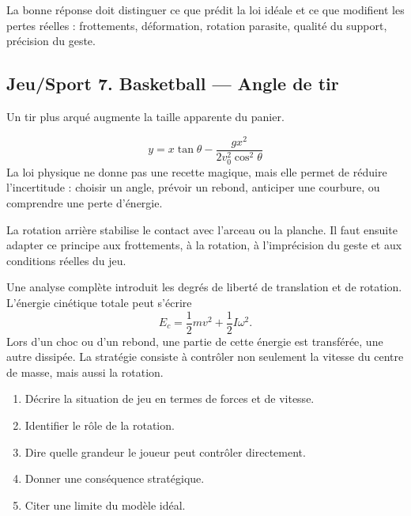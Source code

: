 \documentclass[11pt,a4paper]{article}
\begin{document}
\begin{corrigebox}[Indication]
La bonne réponse doit distinguer ce que prédit la loi idéale et ce que modifient les pertes réelles : frottements, déformation, rotation parasite, qualité du support, précision du geste.
\end{corrigebox}


\subsection{Jeu/Sport 7. Basketball — Angle de tir}

\begin{exemplebox}[Observation]
Un tir plus arqué augmente la taille apparente du panier.
\end{exemplebox}

\begin{theorembox}
\[
y=x\tan\theta-\frac{gx^2}{2v_0^2\cos^2\theta}
\]
La loi physique ne donne pas une recette magique, mais elle permet de réduire l'incertitude : choisir un angle, prévoir un rebond, anticiper une courbure, ou comprendre une perte d'énergie.
\end{theorembox}

\begin{methodebox}
La rotation arrière stabilise le contact avec l'arceau ou la planche.
Il faut ensuite adapter ce principe aux frottements, à la rotation, à l'imprécision du geste et aux conditions réelles du jeu.
\end{methodebox}

\begin{approfondissementbox}
Une analyse complète introduit les degrés de liberté de translation et de rotation. L'énergie cinétique totale peut s'écrire
\[
E_c=\frac12mv^2+\frac12I\omega^2.
\]
Lors d'un choc ou d'un rebond, une partie de cette énergie est transférée, une autre dissipée. La stratégie consiste à contrôler non seulement la vitesse du centre de masse, mais aussi la rotation.
\end{approfondissementbox}

\begin{exercicebox}
\begin{enumerate}
  \item Décrire la situation de jeu en termes de forces et de vitesse.
  \item Identifier le rôle de la rotation.
  \item Dire quelle grandeur le joueur peut contrôler directement.
  \item Donner une conséquence stratégique.
  \item Citer une limite du modèle idéal.
\end{enumerate}
\end{exercicebox}
\end{document}
